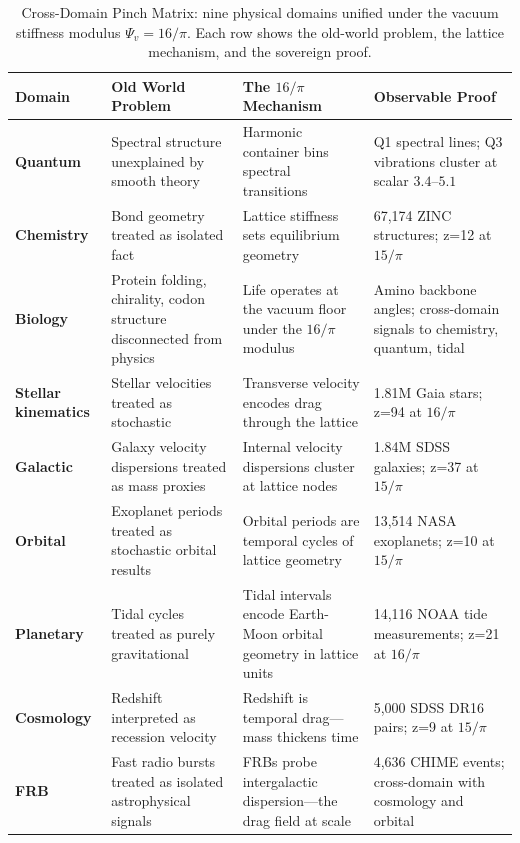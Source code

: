 \documentclass[11pt, letterpaper, openany]{book}
\begin{document}
\begin{table}[H]
\centering
\renewcommand{\arraystretch}{1.5}
\begin{tabular}{|p{}|p{}|p{}|p{}|}
\hline
\textbf{Domain} & \textbf{Old World Problem} & \textbf{The $16/\pi$ Mechanism} & \textbf{Observable Proof} \\
\hline\hline
\textbf{Quantum} & Spectral structure unexplained by smooth theory & Harmonic container bins spectral transitions & Q1 spectral lines; Q3 vibrations cluster at scalar $3.4$--$5.1$ \\
\hline
\textbf{Chemistry} & Bond geometry treated as isolated fact & Lattice stiffness sets equilibrium geometry & 67,174 ZINC structures; z=12 at $15/\pi$ \\
\hline
\textbf{Biology} & Protein folding, chirality, codon structure disconnected from physics & Life operates at the vacuum floor under the $16/\pi$ modulus & Amino backbone angles; cross-domain signals to chemistry, quantum, tidal \\
\hline
\textbf{Stellar kinematics} & Stellar velocities treated as stochastic & Transverse velocity encodes drag through the lattice & 1.81M Gaia stars; z=94 at $16/\pi$ \\
\hline
\textbf{Galactic} & Galaxy velocity dispersions treated as mass proxies & Internal velocity dispersions cluster at lattice nodes & 1.84M SDSS galaxies; z=37 at $15/\pi$ \\
\hline
\textbf{Orbital} & Exoplanet periods treated as stochastic orbital results & Orbital periods are temporal cycles of lattice geometry & 13,514 NASA exoplanets; z=10 at $15/\pi$ \\
\hline
\textbf{Planetary} & Tidal cycles treated as purely gravitational & Tidal intervals encode Earth-Moon orbital geometry in lattice units & 14,116 NOAA tide measurements; z=21 at $16/\pi$ \\
\hline
\textbf{Cosmology} & Redshift interpreted as recession velocity & Redshift is temporal drag---mass thickens time & 5,000 SDSS DR16 pairs; z=9 at $15/\pi$ \\
\hline
\textbf{FRB} & Fast radio bursts treated as isolated astrophysical signals & FRBs probe intergalactic dispersion---the drag field at scale & 4,636 CHIME events; cross-domain with cosmology and orbital \\
\hline
\end{tabular}
\caption{Cross-Domain Pinch Matrix: nine physical domains unified under the vacuum stiffness modulus $\Psi_v = 16/\pi$. Each row shows the old-world problem, the lattice mechanism, and the sovereign proof.}
\label{tab:pinch_matrix}
\end{table}
\end{document}
